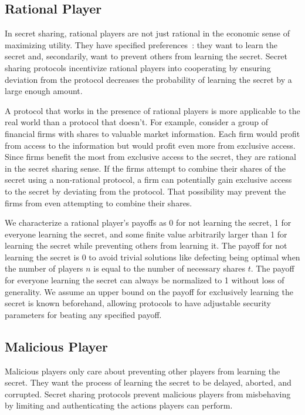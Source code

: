 \documentclass[12pt]{dalcsthesis}
\begin{document}
\subsection{Rational Player}

In secret sharing, rational players are not just rational in the economic sense of maximizing utility. They have specified preferences~\cite{halpern04}: they want to learn the secret and, secondarily, want to prevent others from learning the secret. Secret sharing protocols incentivize rational players into cooperating by ensuring deviation from the protocol decreases the probability of learning the secret by a large enough amount.

A protocol that works in the presence of rational players is more applicable to the real world than a protocol that doesn't. For example, consider a group of financial firms with shares to valuable market information. Each firm would profit from access to the information but would profit even more from exclusive access. Since firms benefit the most from exclusive access to the secret, they are rational in the secret sharing sense. If the firms attempt to combine their shares of the secret using a non-rational protocol, a firm can potentially gain exclusive access to the secret by deviating from the protocol. That possibility may prevent the firms from even attempting to combine their shares.

We characterize a rational player's payoffs as 0 for not learning the secret, 1 for everyone learning the secret, and some finite value arbitrarily larger than 1 for learning the secret while preventing others from learning it. The payoff for not learning the secret is 0 to avoid trivial solutions like defecting being optimal when the number of players $n$ is equal to the number of necessary shares $t$. The payoff for everyone learning the secret can always be normalized to 1 without loss of generality. We assume an upper bound on the payoff for exclusively learning the secret is known beforehand, allowing protocols to have adjustable security parameters for beating any specified payoff.

\subsection{Malicious Player}

Malicious players only care about preventing other players from learning the secret. They want the process of learning the secret to be delayed, aborted, and corrupted. Secret sharing protocols prevent malicious players from misbehaving by limiting and authenticating the actions players can perform.
\end{document}
